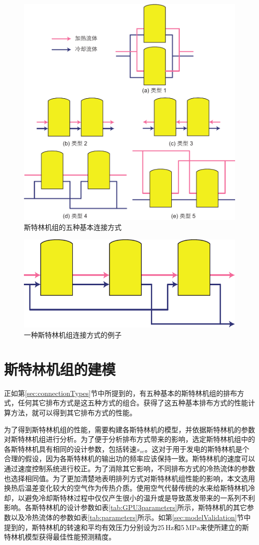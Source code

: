 \noindent \begin{figure}[htbp]
\begin{center}
	\includegraphics[width = 0.7\columnwidth]{fig/BasicSEA}
	\caption{斯特林机组的五种基本连接方式}
	\label{fig:SEA}
\end{center}
\end{figure}

\noindent \begin{figure}[htbp]
\begin{center}
	\includegraphics[width = 0.5\columnwidth]{fig/SEA_eg}
	\caption{一种斯特林机组连接方式的例子}
	\label{fig:SEA_eg}
\end{center}
\end{figure}

\section{斯特林机组的建模}

正如第\ref{sec:connectionTypes}节中所提到的，有五种基本的斯特林机组的排布方式，任何其它排布方式是这五种方式的组合。获得了这五种基本排布方式的性能计算方法，就可以得到其它排布方式的性能。

为了得到斯特林机组的性能，需要构建各斯特林机的模型，并依据斯特林机的参数对斯特林机组进行分析。为了便于分析排布方式带来的影响，选定斯特林机组中的各斯特林机具有相同的设计参数，包括转速$s_{se}$。这对于用于发电的斯特林机是个合理的假设，因为各斯特林机的输出功的频率应该保持一致。斯特林机的速度可以通过速度控制系统进行校正\cite{Hooshang2016}。为了消除其它影响，不同排布方式的冷热流体的参数也选择相同值。为了更加清楚地表明排列方式对斯特林机组性能的影响，本文选用换热后温差变化较大的空气作为传热介质。使用空气代替传统的水来给斯特林机冷却，以避免冷却斯特林过程中仅仅产生很小的温升或是导致蒸发带来的一系列不利影响。各斯特林机的设计参数如表\ref{tab:GPU3parameters}所示，斯特林机的其它参数以及冷热流体的参数如表\ref{tab:parameters}所示。如第\ref{sec:modelValidation}节中提到的，斯特林机的转速和平均有效压力分别设为25$\,\mathrm{Hz}$和5$\,\mathrm{MPa}$来使所建立的斯特林机模型获得最佳性能预测精度。

